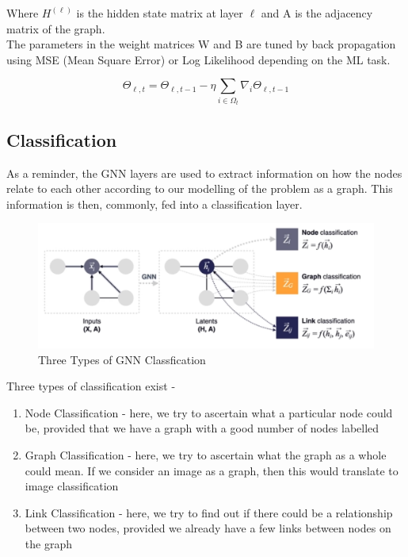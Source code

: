 Where $H^{(\ell)}$ is the hidden state matrix at layer $\ell$ and A is the adjacency matrix of the graph. \\ 
The parameters in the weight matrices W and B are tuned by back propagation using MSE (Mean Square Error) or Log Likelihood depending on the ML task.

\begin{displaymath}
\Theta_{\ell,t} = \Theta_{\ell,t-1} - \eta \sum_{i \in \Omega_t} \nabla_i \Theta_{\ell,t-1}    
\end{displaymath}

\subsection{Classification} \label{section_classification}
As a reminder, the GNN layers are used to extract information on how the nodes relate to each other according to our modelling of the problem as a graph. This information is then, commonly, fed into a classification layer.

\begin{figure}
     \centering
     \includegraphics[width= \textwidth]{pics/Classification_Types.jpg}
     \caption{Three Types of GNN Classfication \cite{noauthor_intro_nodate}}
     \label{Classification_Types}
\end{figure}

Three types of classification exist - 
\begin{enumerate}
    \item Node Classification - here, we try to ascertain what a particular node could be, provided that we have a graph with a good number of nodes labelled
    \item Graph Classification - here, we try to ascertain what the graph as a whole could mean. If we consider an image as a graph, then this would translate to image classification
    \item Link Classification - here, we try to find out if there could be a relationship between two nodes, provided we already have a few links between nodes on the graph
\end{enumerate}

